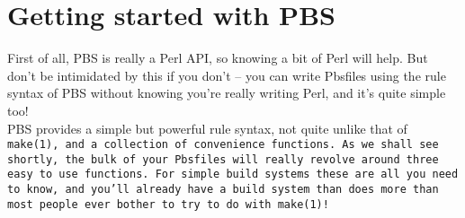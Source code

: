 \section{Getting started with PBS}
First of all, PBS is really a Perl API, so knowing a bit of Perl will help.
But don't be intimidated by this if you don't -- you can write Pbsfiles
using the rule syntax of PBS without knowing you're really writing Perl,
and it's quite simple too!
\\
PBS provides a simple but powerful rule syntax, not quite unlike that of \tt{make(1)},
and a collection of convenience functions. As we shall see shortly, the bulk of your
Pbsfiles will really revolve around three easy to use functions. For simple build systems
these are all you need to know, and you'll already have a build system than does more
than most people ever bother to try to do with \tt{make(1)}!
\\

